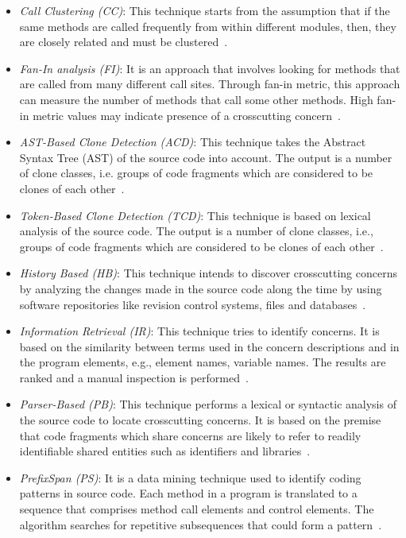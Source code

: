 \begin{itemize}
\item \textit{Call Clustering (CC)}: This technique starts from the assumption that if the same methods are called frequently from within different modules, then, they are closely related and must be clustered~\cite{Danfeng}.

\item \textit{Fan-In analysis (FI)}: It is an approach that involves looking for methods that are called from many different call sites. Through fan-in metric, this approach can measure the number of methods that call some other methods. High fan-in metric values may indicate presence of a crosscutting concern~\cite{Danfeng}.

\item \textit{AST-Based Clone Detection (ACD)}: This technique takes the Abstract Syntax Tree (AST) of the source code into account. The output is a number of clone classes, i.e. groups of code fragments which are considered to be clones of each other~\cite{Bruntink2005}.

\item \textit{Token-Based Clone Detection (TCD)}: This technique is based on lexical analysis of the source code. The output is a number of clone classes, i.e., groups of code fragments which are considered to be clones of each other~\cite{Bruntink2005}.

\item \textit{History Based (HB)}: This technique intends to discover crosscutting concerns by analyzing the changes made in the source code along the time by using software repositories like revision control systems, files and databases~\cite{Mulder:2010:ICC:1862372.1862381}.

\item \textit{Information Retrieval (IR)}: This technique tries to identify concerns. It is based on the similarity between terms used in the concern descriptions and in the program elements, e.g., element names, variable names. The results are ranked and a manual inspection is performed~\cite{Eaddy:2008:CTR:1437898.1438590}.

\item \textit{Parser-Based (PB)}: This technique performs a lexical or syntactic analysis of the source code to locate crosscutting concerns. It is based on the premise that code fragments which share concerns are likely to refer to readily identifiable shared entities such as identifiers and libraries~\cite{Griswold}.

\item \textit{PrefixSpan (PS)}: It is a data mining technique used to identify coding patterns in source code. Each method in a program is translated to a sequence that comprises method call elements and control elements. The algorithm searches for repetitive subsequences that could form a pattern~\cite{Ishio:2008:MCP:1447565.1448040}.


\end{itemize}
